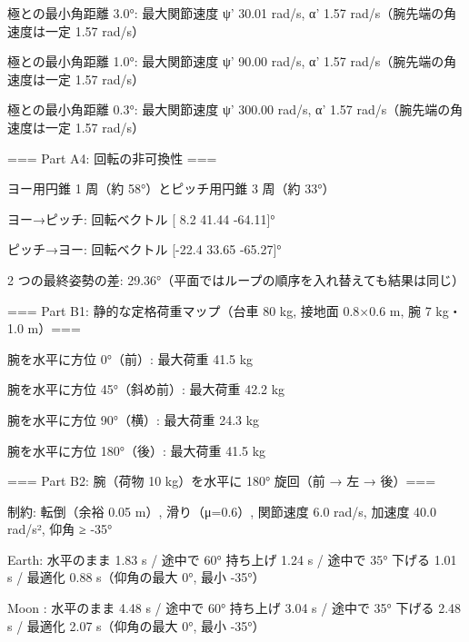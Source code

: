 {  極との最小角距離   3.0°: 最大関節速度 ψ'    30.01 rad/s, α' 1.57 rad/s（腕先端の角速度は一定 1.57 rad/s）\par
  極との最小角距離   1.0°: 最大関節速度 ψ'    90.00 rad/s, α' 1.57 rad/s（腕先端の角速度は一定 1.57 rad/s）\par
  極との最小角距離   0.3°: 最大関節速度 ψ'   300.00 rad/s, α' 1.57 rad/s（腕先端の角速度は一定 1.57 rad/s）\par
\mbox{}\par
=== Part A4: 回転の非可換性 ===\par
  ヨー用円錐 1 周（約 58°）とピッチ用円錐 3 周（約 33°）\par
  ヨー→ピッチ: 回転ベクトル [  8.2   41.44 -64.11]°\par
  ピッチ→ヨー: 回転ベクトル [-22.4   33.65 -65.27]°\par
  2 つの最終姿勢の差: 29.36°（平面ではループの順序を入れ替えても結果は同じ）\par
\mbox{}\par
=== Part B1: 静的な定格荷重マップ（台車 80 kg, 接地面 0.8×0.6 m, 腕 7 kg・1.0 m）===\par
  腕を水平に方位    0°（前）: 最大荷重 41.5 kg\par
  腕を水平に方位   45°（斜め前）: 最大荷重 42.2 kg\par
  腕を水平に方位   90°（横）: 最大荷重 24.3 kg\par
  腕を水平に方位  180°（後）: 最大荷重 41.5 kg\par
\mbox{}\par
=== Part B2: 腕（荷物 10 kg）を水平に 180° 旋回（前 → 左 → 後）===\par
  制約: 転倒（余裕 0.05 m）, 滑り（μ=0.6）, 関節速度 6.0 rad/s, 加速度 40.0 rad/s², 仰角 ≥ -35°\par
  Earth: 水平のまま 1.83 s / 途中で 60° 持ち上げ 1.24 s / 途中で 35° 下げる 1.01 s / 最適化 0.88 s（仰角の最大 0°, 最小 -35°）\par
  Moon : 水平のまま 4.48 s / 途中で 60° 持ち上げ 3.04 s / 途中で 35° 下げる 2.48 s / 最適化 2.07 s（仰角の最大 0°, 最小 -35°）\par
}


